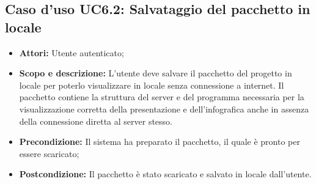 \subsection{Caso d'uso UC6.2: Salvataggio del pacchetto in locale}
	\begin{itemize}
		\item \textbf{Attori:} Utente autenticato;
		\item \textbf{Scopo e descrizione:} L'utente deve salvare il pacchetto del progetto in locale per poterlo visualizzare in locale senza connessione a internet. Il pacchetto contiene la struttura del server e del programma necessaria per la visualizzazione corretta della presentazione e dell'\gls{infografica} anche in assenza della connessione diretta al server stesso.
		\item \textbf{Precondizione:} Il sistema ha preparato il pacchetto, il quale è pronto per essere scaricato;
		\item \textbf{Postcondizione:} Il pacchetto è stato scaricato e salvato in locale dall'utente.
	\end{itemize}

